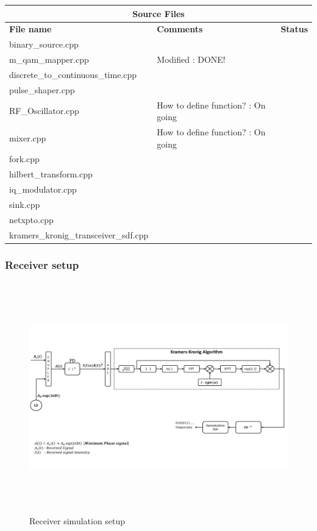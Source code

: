 \begin{center}
	\begin{tabular}{ |p{6cm}||p{7cm}|p{1cm}|   }
		\hline
		\multicolumn{3}{|c|}{\textbf{Source Files}} \\
		\hline
		\textbf{File name} & \textbf{Comments}&\textbf{Status}\\
		\hline
		binary\_source.cpp    				&  &\checkmark\\
		\hline
		m\_qam\_mapper.cpp 					& Modified : DONE! &\checkmark\\
		\hline
		discrete\_to\_continuous\_time.cpp  &  &\checkmark\\
		\hline
		pulse\_shaper.cpp 					&  &\checkmark\\
		\hline
		RF\_Oscillator.cpp				& How to define function? : On going &\checkmark\\
		\hline
		mixer.cpp		 					& How to define function? : On going &\checkmark\\
		\hline
		fork.cpp							&  &\\
		\hline
		hilbert\_transform.cpp				&  &\\
		\hline
		iq\_modulator.cpp					&  &\checkmark\\
		\hline
		sink.cpp							&  &\checkmark\\
		\hline
		netxpto.cpp							&  &\checkmark\\
		\hline
		kramers\_kronig\_transceiver\_sdf.cpp  &  &\checkmark\\
		\hline
	\end{tabular}
\end{center}

\newpage
\subsubsection{Receiver setup}
\begin{figure}[h]
	\centering
	\includegraphics[width=1.0\textwidth, height=10cm]{./sdf/simplified_coherent_receiver/figures/Simulation_setup_Rx.pdf}
	\caption{Receiver simulation setup}\label{Simulation_setup_Rx}
\end{figure}
